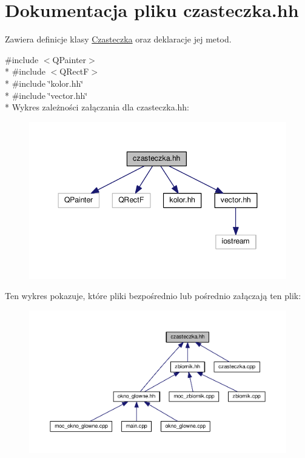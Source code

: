\hypertarget{czasteczka_8hh}{\section{Dokumentacja pliku czasteczka.\-hh}
\label{czasteczka_8hh}
}


Zawiera definicje klasy \hyperlink{class_czasteczka}{Czasteczka} oraz deklaracje jej metod.  


{\ttfamily \#include $<$Q\-Painter$>$}\\*
{\ttfamily \#include $<$Q\-Rect\-F$>$}\\*
{\ttfamily \#include \char`\"{}kolor.\-hh\char`\"{}}\\*
{\ttfamily \#include \char`\"{}vector.\-hh\char`\"{}}\\*
Wykres zależności załączania dla czasteczka.\-hh\-:\nopagebreak
\begin{figure}[H]
\begin{center}
\leavevmode
\includegraphics[width=347pt]{czasteczka_8hh__incl}
\end{center}
\end{figure}
Ten wykres pokazuje, które pliki bezpośrednio lub pośrednio załączają ten plik\-:
\nopagebreak
\begin{figure}[H]
\begin{center}
\leavevmode
\includegraphics[width=350pt]{czasteczka_8hh__dep__incl}
\end{center}
\end{figure}
